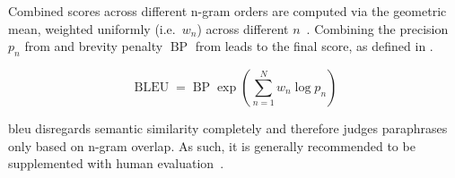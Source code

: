Combined scores across different n-gram orders are computed via the geometric mean, weighted uniformly (i.e.\ $w_n$) across different $n$~\citep{papineni_bleu_2001,banerjee_METEOR_2005}.
Combining the precision $p_n$ from  and brevity penalty $\operatorname{BP}$ from  leads to the final score, as defined in .

\begin{equation}
    \operatorname{BLEU} = \operatorname{BP}  \exp\left(\sum_{n=1}^{N} w_n  \log p_n\right)
\label{eq:bleu_final}
\end{equation}

\ac{bleu} disregards semantic similarity completely and therefore judges paraphrases only based on n-gram overlap. 
As such, it is generally recommended to be supplemented with human evaluation~\citep{zhou_paraphrase_2021}.





